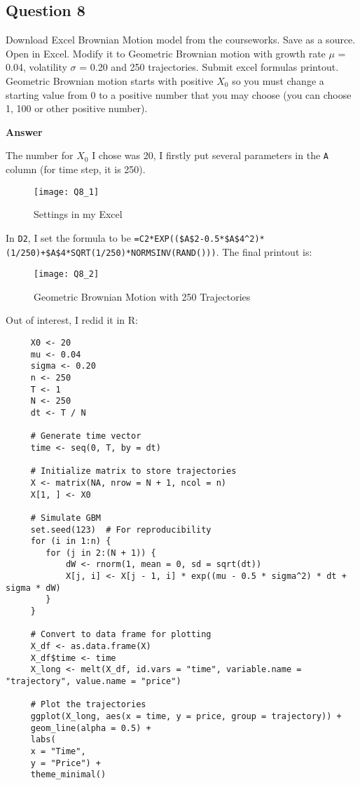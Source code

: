 \documentclass[letterpaper]{article}
\begin{document}
	 \subsection*{Question 8}
	 Download Excel Brownian Motion model from the courseworks. Save as a source. Open in Excel. Modify it to Geometric Brownian motion with growth rate $\mu$ = 0.04, volatility $\sigma$ = 0.20 and 250 trajectories. Submit excel formulas printout. Geometric Brownian motion starts with positive $X_0$ so you must change a starting value from 0 to a positive number that you may choose (you can choose 1, 100 or other positive number).
	 
	 
	 \textbf{Answer}
	 
	 The number for $X_0$ I chose was 20, I firstly put several parameters in the \texttt{A} column (for time step, it is 250).
	 
	 	\begin{figure}[h]
	 		\caption{Settings in my Excel}
	 	\centering
	 	\texttt{[image: Q8\_1]}
	 \end{figure}
	 
	  In \texttt{D2}, I set the formula to be \texttt{=C2*EXP((\$A\$2-0.5*\$A\$4\^{}2)*(1/250)+\$A\$4*SQRT(1/250)*NORMSINV(RAND()))}. The final printout is:
	 
	 \begin{figure}
	 	\caption{Geometric Brownian Motion with 250 Trajectories}
	 	\centering
	 	\texttt{[image: Q8\_2]}
	 \end{figure}
 
 \clearpage
 
 Out of interest, I redid it in R:
 
 \begin{lstlisting}
     X0 <- 20
     mu <- 0.04
     sigma <- 0.20
     n <- 250
     T <- 1
     N <- 250
     dt <- T / N
     
     # Generate time vector
     time <- seq(0, T, by = dt)
     
     # Initialize matrix to store trajectories
     X <- matrix(NA, nrow = N + 1, ncol = n)
     X[1, ] <- X0
     
     # Simulate GBM
     set.seed(123)  # For reproducibility
     for (i in 1:n) {
     	for (j in 2:(N + 1)) {
     		dW <- rnorm(1, mean = 0, sd = sqrt(dt))
     		X[j, i] <- X[j - 1, i] * exp((mu - 0.5 * sigma^2) * dt + sigma * dW)
     	}
     }
     
     # Convert to data frame for plotting
     X_df <- as.data.frame(X)
     X_df$time <- time
     X_long <- melt(X_df, id.vars = "time", variable.name = "trajectory", value.name = "price")
     
     # Plot the trajectories
     ggplot(X_long, aes(x = time, y = price, group = trajectory)) +
     geom_line(alpha = 0.5) +
     labs(
     x = "Time",
     y = "Price") +
     theme_minimal()
 \end{lstlisting}
\end{document}
